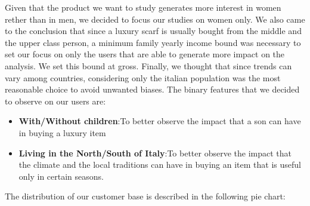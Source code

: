 Given that the product we want to study generates more interest in women rether than in men, we decided to focus our studies on women only. We also came to the conclusion that since a luxury scarf is usually bought from the middle and the upper class person, a minimum family yearly income bound was necessary to set our focus on only the users that are able to generate more impact on the analysis. We set this bound at  gross. Finally, we thought that since trends can vary among countries, considering only the italian population was the most reasonable choice to avoid unwanted biases.
The binary features that we decided to observe on our users are:
\begin{itemize}
	\item \textbf{With/Without children}:\@ To better observe the impact that a son can have in buying a luxury item
	\item \textbf{Living in the North/South of Italy}:\@ To better observe the impact that the climate and the local traditions can have in buying an item that is useful only in certain seasons.
\end{itemize}
The distribution of our customer base is described in the following pie chart:
